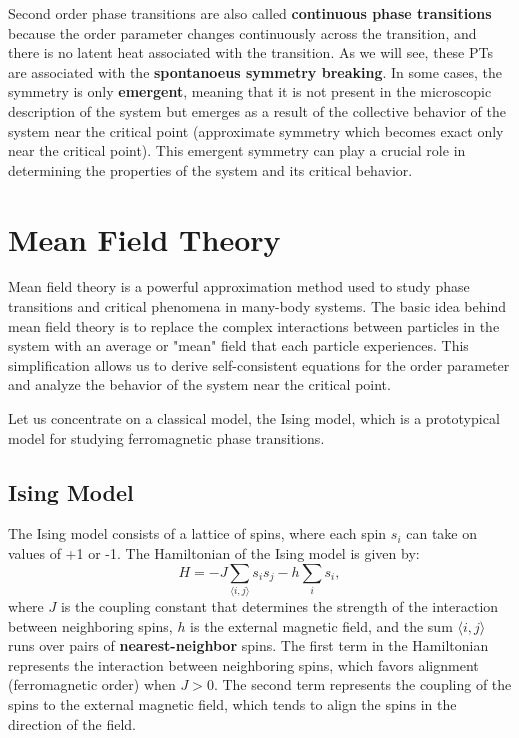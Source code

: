 \begin{remark}
    Second order phase transitions are also called \textbf{continuous phase transitions} because the order parameter changes continuously across the transition, and there is no latent heat associated with the transition. As we will see, these PTs are associated with the \textbf{spontanoeus symmetry breaking}. In some cases, the symmetry is only \textbf{emergent}, meaning that it is not present in the microscopic description of the system but emerges as a result of the collective behavior of the system near the critical point (approximate symmetry which becomes exact only near the critical point). This emergent symmetry can play a crucial role in determining the properties of the system and its critical behavior.
\end{remark}


\section{Mean Field Theory}

Mean field theory is a powerful approximation method used to study phase transitions and critical phenomena in many-body systems. The basic idea behind mean field theory is to replace the complex interactions between particles in the system with an average or "mean" field that each particle experiences. This simplification allows us to derive self-consistent equations for the order parameter and analyze the behavior of the system near the critical point.

Let us concentrate on a classical model, the Ising model, which is a prototypical model for studying ferromagnetic phase transitions.

\subsection{Ising Model} 

The Ising model consists of a lattice of spins, where each spin \(s_i\) can take on values of +1 or -1. The Hamiltonian of the Ising model is given by:
\[
    H = - J \sum_{\langle i,j \rangle} s_i s_j - h \sum_i s_i,
\]
where \(J\) is the coupling constant that determines the strength of the interaction between neighboring spins, \(h\) is the external magnetic field, and the sum \(\langle i,j \rangle\) runs over pairs of \textbf{nearest-neighbor} spins. The first term in the Hamiltonian represents the interaction between neighboring spins, which favors alignment (ferromagnetic order) when \(J > 0\). The second term represents the coupling of the spins to the external magnetic field, which tends to align the spins in the direction of the field.

